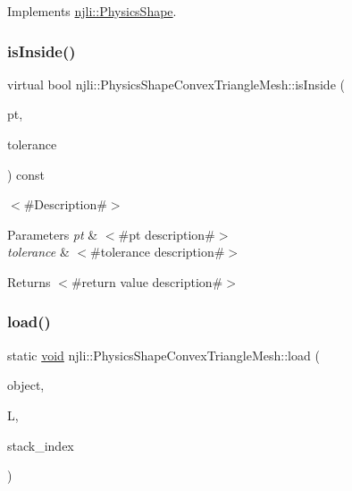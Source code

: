 Implements \mbox{\hyperlink{classnjli_1_1_physics_shape_acb05a16bdbfa5cee6dcbab5c253eb78e}{njli\+::\+Physics\+Shape}}.

\mbox{\label{classnjli_1_1_physics_shape_convex_triangle_mesh_a2b9264f4c5e23ac726d3aab26178f33c}} 
\subsubsection{\texorpdfstring{is\+Inside()}{isInside()}}
{\footnotesize\ttfamily virtual bool njli\+::\+Physics\+Shape\+Convex\+Triangle\+Mesh\+::is\+Inside (\begin{DoxyParamCaption}\item[{const bt\+Vector3 \&}]{pt,  }\item[{\mbox{\hyperlink{_util_8h_a5f6906312a689f27d70e9d086649d3fd}{f32}}}]{tolerance }\end{DoxyParamCaption}) const\hspace{0.3cm}{\ttfamily [virtual]}}

$<$\#\+Description\#$>$


\begin{DoxyParams}{Parameters}
{\em pt} & $<$\#pt description\#$>$ \\
\hline
{\em tolerance} & $<$\#tolerance description\#$>$\\
\hline
\end{DoxyParams}
\begin{DoxyReturn}{Returns}
$<$\#return value description\#$>$ 
\end{DoxyReturn}
\mbox{\label{classnjli_1_1_physics_shape_convex_triangle_mesh_ae14ef3bb61a75e7964ff58a82ec4847f}} 
\subsubsection{\texorpdfstring{load()}{load()}}
{\footnotesize\ttfamily static \mbox{\hyperlink{_thread_8h_af1e856da2e658414cb2456cb6f7ebc66}{void}} njli\+::\+Physics\+Shape\+Convex\+Triangle\+Mesh\+::load (\begin{DoxyParamCaption}\item[{\mbox{\hyperlink{classnjli_1_1_physics_shape_convex_triangle_mesh}{Physics\+Shape\+Convex\+Triangle\+Mesh}} \&}]{object,  }\item[{lua\+\_\+\+State $\ast$}]{L,  }\item[{int}]{stack\+\_\+index }\end{DoxyParamCaption})\hspace{0.3cm}{\ttfamily [static]}}

